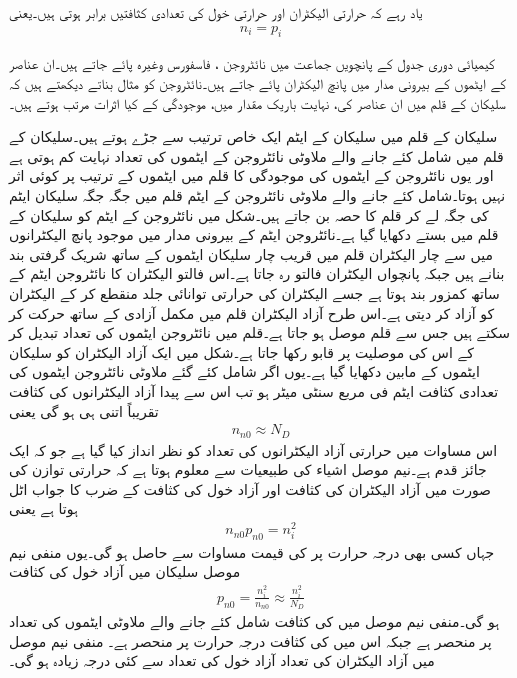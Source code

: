 یاد رہے کہ حرارتی الیکٹران اور حرارتی خول کی تعدادی کثافتیں برابر ہوتی ہیں۔یعنی
\begin{align}
n_i = p_i
\end{align}

کیمیائی دوری جدول کے پانچویں جماعت میں نائٹروجن ، فاسفورس   وغیرہ پائے جاتے ہیں۔ان عناصر کے ایٹموں کے بیرونی مدار میں پانچ الیکٹران پائے جاتے ہیں۔نائٹروجن کو مثال بناتے دیکھتے ہیں کہ سلیکان کے قلم میں ان عناصر کی، نہایت باریک مقدار میں، موجودگی کے کیا اثرات مرتب ہوتے ہیں۔

سلیکان کے قلم میں سلیکان کے ایٹم ایک خاص ترتیب سے جڑے ہوتے ہیں۔سلیکان کے قلم میں شامل کئے جانے والے ملاوٹی نائٹروجن کے ایٹموں کی تعداد   نہایت کم ہوتی ہے اور یوں نائٹروجن کے ایٹموں کی موجودگی کا قلم میں ایٹموں کے ترتیب پر کوئی اثر نہیں ہوتا۔شامل کئے جانے والے ملاوٹی  نائٹروجن کے ایٹم قلم میں جگہ جگہ سلیکان ایٹم کی جگہ لے کر  قلم  کا حصہ بن جاتے ہیں۔شکل   میں نائٹروجن کے ایٹم کو سلیکان کے قلم میں بستے دکھایا گیا ہے۔نائٹروجن ایٹم کے بیرونی مدار میں موجود پانچ الیکٹرانوں میں سے چار الیکٹران قلم میں قریب چار سلیکان ایٹموں کے ساتھ شریک گرفتی بند بنانے ہیں جبکہ پانچواں الیکٹران فالتو رہ جاتا ہے۔اس فالتو الیکٹران کا نائٹروجن ایٹم کے ساتھ کمزور بند  ہوتا ہے جسے الیکٹران کی حرارتی توانائی جلد منقطع کر کے الیکٹران کو آزاد کر دیتی ہے۔اس طرح آزاد الیکٹران قلم میں مکمل آزادی کے ساتھ حرکت کر سکتے ہیں جس سے قلم موصل ہو جاتا ہے۔قلم میں نائٹروجن ایٹموں کی تعداد تبدیل کر کے اس کی موصلیت پر قابو رکھا جاتا ہے۔شکل   میں ایک آزاد الیکٹران  کو سلیکان ایٹموں کے مابین دکھایا گیا ہے۔یوں اگر شامل کئے گئے ملاوٹی نائٹروجن ایٹموں کی تعدادی کثافت  ایٹم فی مربع سنٹی میٹر ہو تب اس سے پیدا آزاد الیکٹرانوں کی کثافت  تقریباً اتنی ہی ہو گی یعنی
\begin{align}
n_{n0} \approx N_D
\end{align}
اس مساوات میں حرارتی آزاد الیکٹرانوں کی تعداد کو نظر انداز کیا گیا ہے جو کہ ایک جائز قدم ہے۔نیم موصل اشیاء کی طبیعیات سے معلوم ہوتا ہے کہ حرارتی توازن کی صورت میں آزاد الیکٹران کی کثافت   اور آزاد خول کی کثافت   کے ضرب کا جواب اٹل ہوتا ہے یعنی
\begin{align} \label{مساوات_ڈایوڈ_حرارتی_توازن_میں_اٹل_تعدادی_کثافتیں}
n_{n0} p_{n0} = n_i^{2}
\end{align}
جہاں کسی بھی درجہ حرارت پر  کی قیمت مساوات   سے حاصل ہو گی۔یوں منفی نیم موصل سلیکان میں آزاد خول کی کثافت
\begin{align}
p_{n0} = \frac{n_i^2}{n_{n0}} \approx \frac{n_i^2}{N_D}
\end{align}
ہو گی۔منفی نیم موصل میں  کی کثافت شامل کئے جانے والے ملاوٹی ایٹموں کی تعداد پر منحصر ہے جبکہ اس میں  کی کثافت درجہ حرارت پر منحصر ہے۔ منفی نیم موصل میں آزاد الیکٹران کی تعداد آزاد خول کی تعداد سے کئی درجہ زیادہ ہو گی۔

